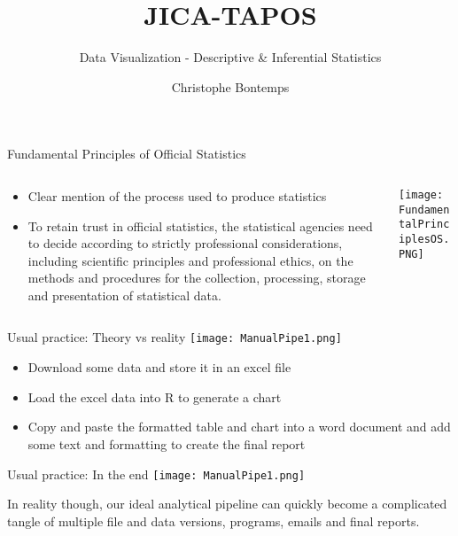 \documentclass[xcolor=x11names,compress]{beamer}
\title{\textcolor{siap}{JICA-TAPOS}}
\subtitle{\textcolor{siap}{\large{Data Visualization - Descriptive \& Inferential  Statistics}}}
\author{Christophe Bontemps}
\institute{\large{\emph{Statistical Institute for Asia and the Pacific} } \\
    \texttt{[image: SIAP\_logo\_Big.png]}}
\date{}
\renewcommand{\(}{\begin{columns}}
\renewcommand{\)}{\end{columns}}
\newcommand{\<}[1]{\begin{column}{#1}}
\renewcommand{\>}{\end{column}}
\begin{document}
\begin{frame}
  \titlepage
\end{frame}

\begin{frame}{Fundamental Principles of Official Statistics}
  \begin{columns}[T]
    \begin{column}{0.6\textwidth}
      \begin{itemize}
        \item Clear mention of the process used to produce statistics
        \item To retain trust in official statistics, the statistical agencies need to decide according to strictly professional considerations, including scientific principles and professional ethics, on the methods and procedures for the collection, processing, storage and presentation of statistical data.
      \end{itemize}
    \end{column}
    \begin{column}{0.4\textwidth}
      \texttt{[image: FundamentalPrinciplesOS.PNG]}
    \end{column}
  \end{columns}
\end{frame}

\begin{frame}{Usual practice: Theory vs reality}
  \centering
  \texttt{[image: ManualPipe1.png]}

  \medskip

  \begin{itemize}
    \item Download some data and store it in an excel file
    \item Load the excel data into R to generate a chart
    \item Copy and paste the formatted table and chart into a word document and add some text and formatting to create the final report
  \end{itemize}
\end{frame}


\begin{frame}{Usual practice: In the end}
  \centering
  \texttt{[image: ManualPipe1.png]}

  \medskip

  In reality though, our ideal analytical pipeline can quickly become a complicated tangle of multiple file and data versions, programs, emails and final reports.
\end{frame}
\end{document}
